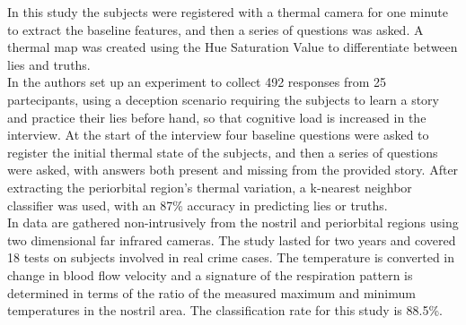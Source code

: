 In this study the subjects were registered with a thermal camera for one minute to extract the baseline features, and then a series of questions was asked. A thermal map was created using the Hue Saturation Value to differentiate between lies and truths.\\
In \cite{Rajoub} the authors set up an experiment to collect 492 responses from 25 partecipants, using a deception scenario requiring the subjects to learn a story and practice their lies before hand, so that cognitive load is increased in the interview. At the start of the interview four baseline questions were asked to register the initial thermal state of the subjects, and then a series of questions were asked, with answers both present and missing from the provided story. After extracting the periorbital region's thermal variation, a k-nearest neighbor classifier was used, with an 87\% accuracy in predicting lies or truths.  \\
In \cite{6967765} data are gathered non-intrusively from the nostril and periorbital regions using two dimensional far infrared cameras. The study lasted for two years and covered 18 tests on subjects involved in real crime cases. The temperature is converted in change in blood flow velocity and a signature of the respiration pattern is determined in terms of the ratio of the measured maximum and minimum temperatures in the nostril area. The classification rate for this study is 88.5\%.



